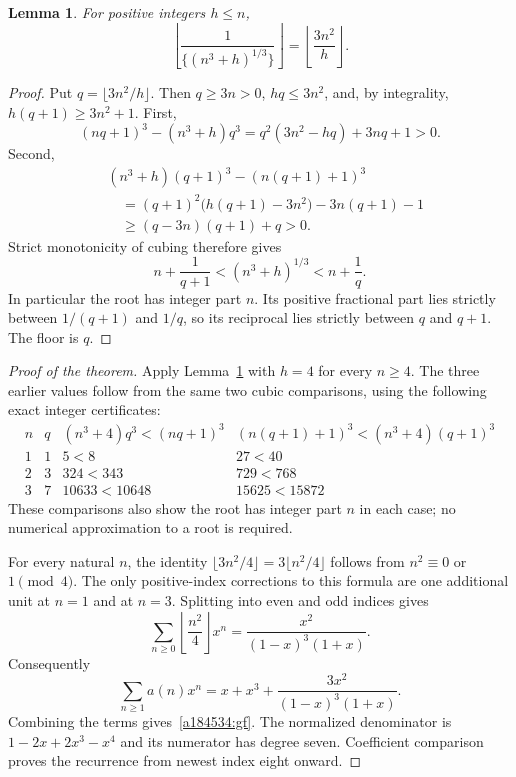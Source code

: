 \documentclass[11pt]{article}
\newtheorem{lemma}[theorem]{Lemma}
\begin{document}
\begin{lemma}\label{a184534:general}
For positive integers $h\le n$,
\[
 \left\lfloor\frac1{\{(n^3+h)^{1/3}\}}\right\rfloor
 =\left\lfloor\frac{3n^2}{h}\right\rfloor.
\]
\end{lemma}
\begin{proof}
Put $q=\lfloor3n^2/h\rfloor$. Then $q\ge3n>0$,
$hq\le3n^2$, and, by integrality, $h(q+1)\ge3n^2+1$.
First,
\[
 (nq+1)^3-(n^3+h)q^3
 =q^2(3n^2-hq)+3nq+1>0.
\]
Second,
\begin{align*}
 &(n^3+h)(q+1)^3-(n(q+1)+1)^3\\
 &\quad=(q+1)^2\bigl(h(q+1)-3n^2\bigr)-3n(q+1)-1\\
 &\quad\ge(q-3n)(q+1)+q>0.
\end{align*}
Strict monotonicity of cubing therefore gives
\[
 n+\frac1{q+1}<(n^3+h)^{1/3}<n+\frac1q.
\]
In particular the root has integer part $n$. Its positive fractional
part lies strictly between $1/(q+1)$ and $1/q$, so its reciprocal lies
strictly between $q$ and $q+1$. The floor is $q$.
\end{proof}

\begin{proof}[Proof of the theorem]
Apply Lemma~\ref{a184534:general} with $h=4$ for every $n\ge4$.
The three earlier values follow from the same two cubic comparisons,
using the following exact integer certificates:
\[
\begin{array}{c|c|c|c}
n&q&(n^3+4)q^3<(nq+1)^3&
(n(q+1)+1)^3<(n^3+4)(q+1)^3\\\hline
1&1&5<8&27<40\\
2&3&324<343&729<768\\
3&7&10633<10648&15625<15872
\end{array}
\]
These comparisons also show the root has integer part $n$ in each
case; no numerical approximation to a root is required.

For every natural $n$, the identity
$\lfloor3n^2/4\rfloor=3\lfloor n^2/4\rfloor$ follows from
$n^2\equiv0$ or $1\pmod4$. The only positive-index corrections to this
formula are one additional unit at $n=1$ and at $n=3$. Splitting into
even and odd indices gives
\[
 \sum_{n\ge0}\left\lfloor\frac{n^2}4\right\rfloor x^n
 =\frac{x^2}{(1-x)^3(1+x)}.
\]
Consequently
\[
 \sum_{n\ge1}a(n)x^n
 =x+x^3+\frac{3x^2}{(1-x)^3(1+x)}.
\]
Combining the terms gives~\eqref{a184534:gf}. The normalized denominator
is $1-2x+2x^3-x^4$ and its numerator has degree seven. Coefficient
comparison proves the recurrence from newest index eight onward.
\end{proof}
\end{document}
